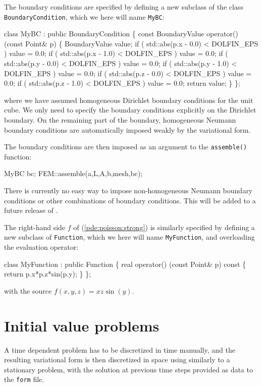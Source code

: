 The boundary conditions are specified by defining a new subclass 
of the class \texttt{BoundaryCondition}, 
which we here will name \texttt{MyBC}: 
\begin{code}
  class MyBC : public BoundaryCondition
  \{
    const BoundaryValue operator() (const Point& p)
    \{
      BoundaryValue value;
      if ( std::abs(p.x - 0.0) < DOLFIN_EPS ) value = 0.0;
      if ( std::abs(p.x - 1.0) < DOLFIN_EPS ) value = 0.0;
      if ( std::abs(p.y - 0.0) < DOLFIN_EPS ) value = 0.0;
      if ( std::abs(p.y - 1.0) < DOLFIN_EPS ) value = 0.0;
      if ( std::abs(p.z - 0.0) < DOLFIN_EPS ) value = 0.0;
      if ( std::abs(p.z - 1.0) < DOLFIN_EPS ) value = 0.0;
        return value;
    \}
  \};
\end{code}
where we have assumed homogeneous Dirichlet boundary conditions for the 
unit cube. 
We only need to specify the boundary conditions explicitly on the
Dirichlet boundary. On the remaining part of the boundary, 
homogeneous Neumann boundary conditions are automatically imposed 
weakly by the variational form. 

The boundary conditions are then imposed as an argument to  
the \texttt{assemble()} function: 
\begin{code}
MyBC bc; 
FEM::assemble(a,L,A,b,mesh,bc);
\end{code}

There is currently no easy way to impose non-homogeneous
Neumann boundary conditions or other combinations of boundary
conditions. This will be added to a future release of \dolfin{}.

The right-hand side $f$ of (\ref{pde:poisson:strong}) is similarly 
specified by defining a new subclass of \texttt{Function}, which we
here will name \texttt{MyFunction}, and overloading the evaluation
operator: 
\begin{code}
  class MyFunction : public Function
  \{
    real operator() (const Point& p) const
    \{
      return p.x*p.z*sin(p.y);
    \}
  \};
\end{code}
with the source $f(x, y, z) = x z \sin(y)$. 

\section{Initial value problems}

A time dependent problem has to be discretized in time manually, 
and the resulting variational form is then discretized in space 
using \ffc{} similarly to a stationary problem, with the solution 
at previous time steps provided as data to the \texttt{form} file. 

